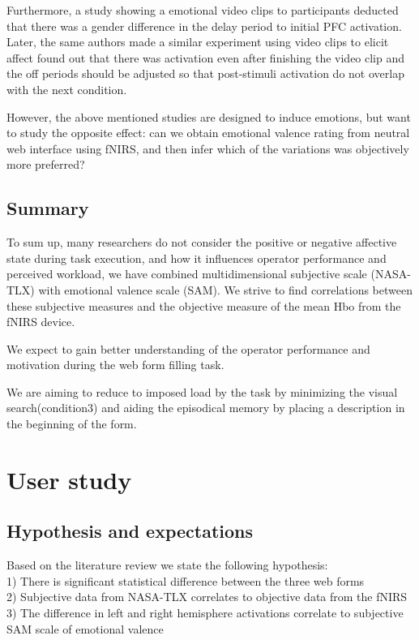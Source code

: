 \documentclass[a4paper]{report}
\begin{document}
			Furthermore, a study showing a emotional video clips\cite{leon2006differential} to participants deducted that there was a gender difference in the delay period to initial PFC activation. Later, the same authors made a similar experiment \cite{leon2007lasting} using video clips to elicit affect found out that there was activation even after finishing the video clip and the off periods should be adjusted so that post-stimuli activation do not overlap with the next condition.

			However, the above mentioned studies are designed to induce emotions, but want to study the opposite effect: can we obtain emotional valence rating from neutral web interface using fNIRS, and then infer which of the variations was objectively more preferred?

	\section{Summary}
		To sum up, many researchers do not consider the positive or negative affective state during task execution, and how it influences operator performance and perceived workload, we have combined multidimensional subjective scale (NASA-TLX) with emotional valence scale (SAM). We strive to find correlations between these subjective measures and the objective measure of the mean Hbo from the fNIRS device. 
		
		We expect to gain better understanding of the operator performance and motivation during the web form filling task.

		We are aiming to reduce to imposed load by the task by minimizing the visual search(condition3) and aiding the episodical memory by placing a description in the beginning of the form.
\chapter{User study}
	\section{Hypothesis and expectations}
	Based on the literature review we state the following hypothesis:\\
	1) There is significant statistical difference between the three web forms\\
	2) Subjective data from NASA-TLX correlates to objective data from the fNIRS\\
	3) The difference in left and right hemisphere activations correlate to subjective SAM scale of emotional valence\\	
\end{document}
